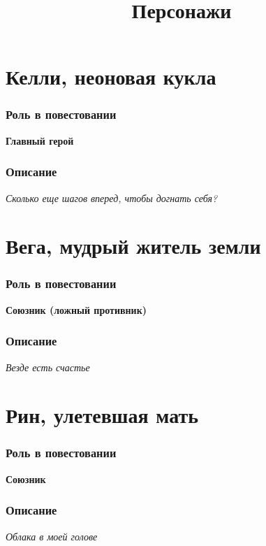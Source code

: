 
\title{Персонажи}
\maketitle
\tableofcontents


\clearpage
\part{Келли, неоновая кукла}
\section{Роль в повестовании}
\textbf{Главный герой}\\
\section{Описание}
\textit{Сколько еще шагов вперед, чтобы догнать себя?}\\








\clearpage
\part{Вега, мудрый житель земли}
\section{Роль в повестовании}
\textbf{Союзник (ложный противник)}\\
\section{Описание}
\textit{Везде есть счастье}\\











\clearpage
\part{Рин, улетевшая мать}
\section{Роль в повестовании}
\textbf{Союзник}\\
\section{Описание}
\textit{Облака в моей голове}\\









